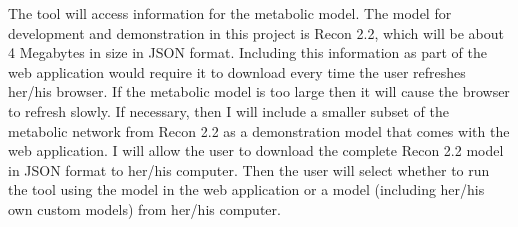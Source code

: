 \begin{enumerate}
The tool will access information for the metabolic model.
The model for development and demonstration in this project is Recon 2.2, which will be about 4 Megabytes in size in JSON format.
Including this information as part of the web application would require it to download every time the user refreshes her/his browser.
If the metabolic model is too large then it will cause the browser to refresh slowly.
If necessary, then I will include a smaller subset of the metabolic network from Recon 2.2 as a demonstration model that comes with the web application.
I will allow the user to download the complete Recon 2.2 model in JSON format to her/his computer.
Then the user will select whether to run the tool using the model in the web application or a model (including her/his own custom models) from her/his computer.

\end{enumerate}